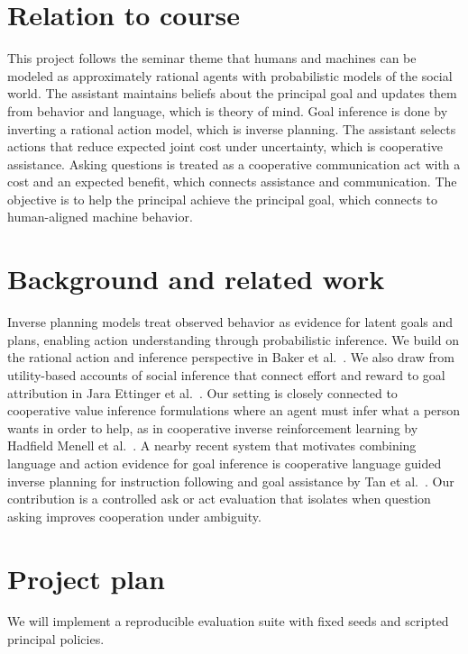 \documentclass[10pt,twocolumn]{article}
\begin{document}
\section*{Relation to course}
This project follows the seminar theme that humans and machines can be modeled as approximately rational agents with probabilistic models of the social world.
The assistant maintains beliefs about the principal goal and updates them from behavior and language, which is theory of mind.
Goal inference is done by inverting a rational action model, which is inverse planning.
The assistant selects actions that reduce expected joint cost under uncertainty, which is cooperative assistance.
Asking questions is treated as a cooperative communication act with a cost and an expected benefit, which connects assistance and communication.
The objective is to help the principal achieve the principal goal, which connects to human-aligned machine behavior.

\section*{Background and related work}
Inverse planning models treat observed behavior as evidence for latent goals and plans, enabling action understanding through probabilistic inference.
We build on the rational action and inference perspective in Baker et al.\ \cite{baker2009}.
We also draw from utility-based accounts of social inference that connect effort and reward to goal attribution in Jara Ettinger et al.\ \cite{jara2016}.
Our setting is closely connected to cooperative value inference formulations where an agent must infer what a person wants in order to help, as in cooperative inverse reinforcement learning by Hadfield Menell et al.\ \cite{hadfield2016cirl}.
A nearby recent system that motivates combining language and action evidence for goal inference is cooperative language guided inverse planning for instruction following and goal assistance by Tan et al.\ \cite{tan2024clips}.
Our contribution is a controlled ask or act evaluation that isolates when question asking improves cooperation under ambiguity.

\section*{Project plan}
We will implement a reproducible evaluation suite with fixed seeds and scripted principal policies.
\end{document}
